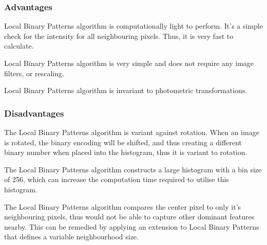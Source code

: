 \documentclass[conference]{IEEEtran}
\begin{document}
%
%


\subsubsection{Advantages}
Local Binary Patterns algorithm is computationally light to perform.  It's a
simple check for the intensity for all neighbouring pixels.  Thus, it is very
fast to calculate\cite{lbp-4}.

Local Binary Patterns algorithm is very simple and does not require any image
filters, or rescaling.

Local Binary Patterns algorithm is invariant to photometric
transformations\cite{lbp-4}.


\subsubsection{Disadvantages}
The Local Binary Patterns algorithm is variant against rotation. When an image
is rotated, the binary encoding will be shifted, and thus creating a different
binary number when placed into the histogram, thus it is variant to
rotation\cite{lbp-4}.

The Local Binary Patterns algorithm constructs a large histogram with a bin
size of 256\cite{lbp-2}, which can increase the computation time required to
utilise this histogram.

The Local Binary Patterns algorithm compares the center pixel to only it's
neighbouring pixels, thus would not be able to capture other dominant features
nearby\cite{lbp-5}. This can be remedied by applying an extension to Local
Binary Patterns that defines a variable neighbourhood size\cite{lbp-2}.


%
%
\end{document}
